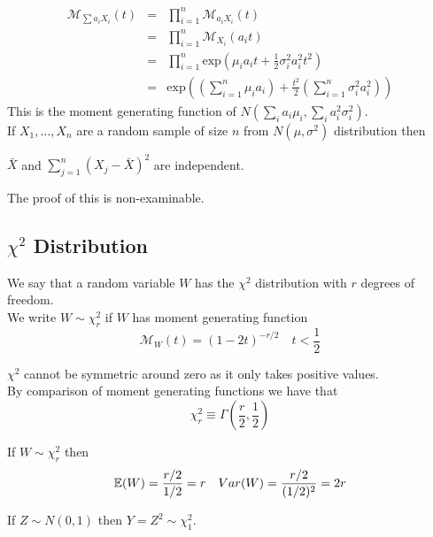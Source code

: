 \documentclass[11pt,a4paper]{article}
\begin{document}
\[\begin{array}{rcl}
\mathcal{M}_{\sum a_iX_i}(t)&=&\prod_{i=1}^n\mathcal{M}_{a_iX_i}(t)\\
&=&\prod_{i=1}^n\mathcal{M}_{X_i}(a_it)\\
&=&\prod_{i=1}^n\mathrm{exp}(\mu_ia_it+\frac{1}{2}\sigma_i^2a_i^2t^2)\\
&=&\mathrm{exp}\left(\left(\sum_{i=1}^n\mu_ia_i\right)+\frac{t^2}{2}\left(\sum_{i=1}^n\sigma_i^2a_i^2\right)\right)
\end{array}\]
This is the moment generating function of $N(\sum_ia_i\mu_i,\sum_ia_i^2\sigma_i^2)$.\\

If $X_1,\dots,X_n$ are a random sample of size $n$ from $N(\mu,\sigma^2)$ distribution then
\begin{center}
$\bar{X}$ and $\sum\limits_{j=1}^n(X_j-\bar{X})^2$ are independent.
\end{center}
\nb The proof of this is non-examinable.

\subsection{$\chi^2$ Distribution}

We say that a random variable $W$ has the $\chi^2$ distribution with $r$ degrees of freedom.\\
We write $W\sim\chi^2_r$ if $W$ has moment generating function
$$\mathcal{M}_W(t)=(1-2t)^{-r/2}\quad t<\frac{1}{2}$$

$\chi^2$ cannot be symmetric around zero as it only takes positive values.\\

By comparison of moment generating functions we have that
$$\chi^2_r\equiv\Gamma\left(\frac{r}{2},\frac{1}{2}\right)$$

If $W\sim\chi^2_r$ then
$$\mathbb{E}(W)=\frac{r/2}{1/2}=r\quad Var(W)=\frac{r/2}{(1/2)^2}=2r$$

If $Z\sim N(0,1)$ then $Y=Z^2\sim\chi^2_1$.\\
\end{document}
